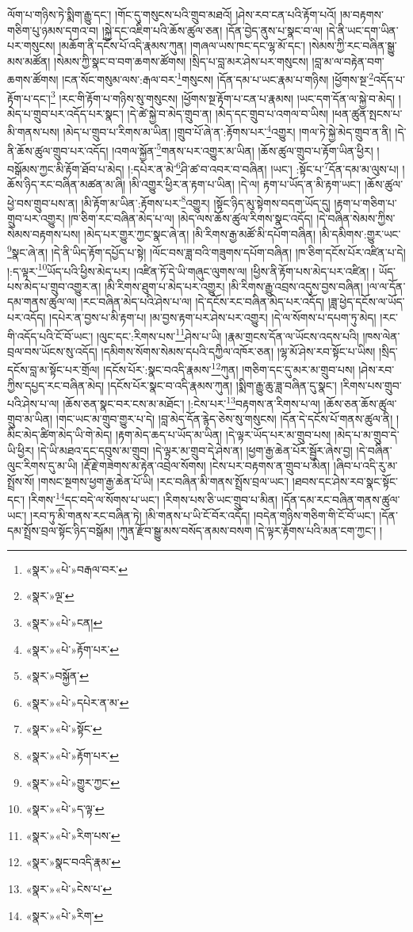 ལོག་པ་གཉིས་ཏེ་སྨིག་རྒྱུ་དང་། །གོང་དུ་གསུངས་པའི་གྲུབ་མཐའོ། །ཤེས་རབ་ངན་པའི་རྟོག་པའོ། །མ་བརྟགས་གཅིག་པུ་ཉམས་དགའ་བ། །སྐྱེ་དང་འཇིག་པའི་ཆོས་ཚུལ་ཅན། །དོན་བྱེད་ནུས་པ་སྣང་བ་ལ། །དེ་ནི་ཡང་དག་ཡིན་པར་གསུངས། །མཆོག་ནི་དངོས་པོ་འདི་རྣམས་ཀུན། །གཞལ་ཡས་ཁང་དང་ལྷ་མོ་དང་། །སེམས་ཀྱི་རང་བཞིན་སྒྱུ་མས་མཚོན། །སེམས་ཀྱི་སྣང་བ་བག་ཆགས་ཚོགས། །སྲིད་པ་བླ་མར་ཤེས་པར་གསུངས། །བླ་མ་ལ་བརྟེན་བག་ཆགས་ཚོགས། །ངན་སོང་གསུམ་ལས་:རྒལ་བར་\footnote{«སྣར་»«པེ་»བརྒལ་བར་}གསུངས། །དོན་དམ་པ་ཡང་རྣམ་པ་གཉིས། །ཕྱོགས་སྔ་\footnote{«སྣར་»ལྔ་}འདོད་པ་རྟོག་པ་དང་།\footnote{«སྣར་»«པེ་»ངན།} །རང་གི་རྟོག་པ་གཉིས་སུ་གསུངས། །ཕྱོགས་སྔ་རྟོག་པ་ངན་པ་རྣམས། །ཡང་དག་དོན་ལ་སྐྱེ་བ་མེད། །མེད་པ་གྲུབ་པར་འདོད་པར་སྣང་། །དེ་ཚེ་སྐྱེ་བ་མེད་གྲུབ་ན། །མེད་དང་གྲུབ་པ་འགལ་བ་ཡིས། །ཕན་ཚུན་སྤངས་པ་མི་གནས་པས། །མེད་པ་གྲུབ་པ་རིགས་མ་ཡིན། །གྲུབ་པོ་ཞེ་ན་:རྟོགས་པར་\footnote{«སྣར་»«པེ་»རྟོག་པར་}འགྱུར། །གལ་ཏེ་སྐྱེ་མེད་གྲུབ་ན་ནི། །དེ་ནི་ཆོས་ཚུལ་གྲུབ་པར་འདོད། །འགལ་སྐྱོན་\footnote{«སྣར་»བསྐྱོན་}གནས་པར་འགྱུར་མ་ཡིན། །ཆོས་ཚུལ་གྲུབ་པ་རྟོག་ཡིན་ཕྱིར། །བསྒོམས་ཀྱང་མི་རྟོག་ཐོབ་པ་མེད། །:དཔེར་ན་མེ་\footnote{«སྣར་»«པེ་»དཔེར་ན་མ་}ཤི་ཚ་བ་འབར་བ་བཞིན། །ཡང་། :སྟོང་པ་\footnote{«སྣར་»«པེ་»སྟོང་}དོན་དམ་མ་ལུས་པ། །ཆོས་ཉིད་རང་བཞིན་མཚན་མ་ཞི། །མི་འགྱུར་ཕྱིར་ན་རྟག་པ་ཡིན། །དེ་ལ། རྟག་པ་ཡོད་ན་མི་རྟག་ཡང་། །ཆོས་ཚུལ་ཕྱེ་བས་གྲུབ་པས་ན། །མི་རྟོག་མ་ཡིན་:རྟོགས་པར་\footnote{«སྣར་»«པེ་»རྟོག་པར་}འགྱུར། །སྟོང་ཉིད་མུ་སྟེགས་བདག་ཡོད་དུ། །རྟག་པ་གཅིག་པ་གྲུབ་པར་འགྱུར། །ཁ་ཅིག་རང་བཞིན་མེད་པ་ལ། །མེད་ལས་ཆོས་ཚུལ་རིགས་སྣང་འདོད། །དེ་བཞིན་སེམས་ཀྱིས་སེམས་བརྟགས་པས། །མེད་པར་གྱུར་ཀྱང་སྣང་ཞེ་ན། །མི་རིགས་རྒྱ་མཚོ་མི་དཔོག་བཞིན། །མི་དམིགས་:གྱུར་ཡང་\footnote{«སྣར་»«པེ་»གྱུར་ཀྱང་}སྣང་ཞེ་ན། །དེ་ནི་ཡིད་རྟོག་དཔྱོད་པ་སྟེ། །ལོང་བས་ཟླ་བའི་གཟུགས་དཔོག་བཞིན། །ཁ་ཅིག་དངོས་པོར་འཛིན་པ་དེ། །:ད་ལྟར་\footnote{«སྣར་»«པེ་»ད་ལྟ་}ཡོད་པའི་ཕྱིས་མེད་པར། །འཛིན་ཏོ་དེ་ཡི་གཞུང་ལུགས་ལ། །ཕྱིས་ནི་རྟོག་པས་མེད་པར་འཛིན། །
ཡོད་པས་མེད་པ་གྲུབ་འགྱུར་ན། །མི་རིགས་ཐུག་པ་མེད་པར་འགྱུར། །མི་རིགས་རྒྱུ་འབྲས་འདུས་བྱས་བཞིན། །ལ་ལ་དོན་དམ་གནས་ཚུལ་ལ། །རང་བཞིན་མེད་པའི་ཤེས་པ་ལ། །དེ་དངོས་རང་བཞིན་མེད་པར་འདོད། །ཟླ་ཕྱེད་དངོས་ལ་ཡོད་པར་འདོད། །དཔེར་ན་བྱས་པ་མི་རྟག་པ། །མ་བྱས་རྟག་པར་ཤེས་པར་འགྱུར། །དེ་ལ་སོགས་པ་དཔག་ཏུ་མེད། །རང་གི་འདོད་པའི་ངོ་བོ་ཡང་། །ལུང་དང་:རིགས་པས་\footnote{«སྣར་»«པེ་»རིག་པས་}ཤེས་པ་ཡི། །རྣམ་གྲངས་དོན་ལ་ཡོངས་འདས་པའི། །ཁས་ལེན་བྲལ་བས་ཡོངས་སུ་འདོད། །དམིགས་སོགས་སེམས་དཔའི་དཀྱིལ་འཁོར་ཅན། །ལྷ་མོ་ཤེས་རབ་སྟོང་པ་ཡིས། །སྲིད་དངོས་བླ་མ་སྟོང་པར་གྲོལ། །དངོས་པོར་:སྣང་བའདི་རྣམས་\footnote{«སྣར་»སྣང་བའདི་རྣམ་}ཀུན། །གཅིག་དང་དུ་མར་མ་གྲུབ་པས། །ཤེས་རབ་ཀྱིས་དཔྱད་རང་བཞིན་མེད། །དངོས་པོར་སྣང་བ་འདི་རྣམས་ཀུན། །སྨིག་རྒྱུ་ཆུ་ཟླ་བཞིན་དུ་སྣང་། །རིགས་པས་གྲུབ་པའི་ཤེས་པ་ལ། །ཆོས་ཅན་སྣང་བར་ངས་མ་མཐོང་། །:ངེས་པར་\footnote{«སྣར་»«པེ་»ངེས་པ་}བརྟགས་ན་རིགས་པ་ལ། །ཆོས་ཅན་ཆོས་ཚུལ་གྲུབ་མ་ཡིན། །གང་ཡང་མ་གྲུབ་གྱུར་པ་དེ། །བླ་མེད་དོན་རྙེད་ཅེས་སུ་གསུངས། །དོན་དེ་དངོས་པོ་གནས་ཚུལ་ནི། །མིང་མེད་ཚིག་མེད་ཡི་གེ་མེད། །རྟག་མེད་ཆད་པ་ཡོད་མ་ཡིན། །དེ་ལྟར་ཡོད་པར་མ་གྲུབ་པས། །མེད་པ་མ་གྲུབ་དེ་ཡི་ཕྱིར། །དེ་ཡི་མཐའ་དང་དབུས་མ་གྲུབ། །དེ་ལྟར་མ་གྲུབ་དེ་ཤེས་ན། །ཕྱག་རྒྱ་ཆེན་པོར་སྦྱོར་ཞེས་བྱ། །དེ་བཞིན་ལུང་རིགས་དུ་མ་ཡི། །རྡོ་རྗེ་གཟེགས་མ་རྟེན་འབྲེལ་སོགས། །ངེས་པར་བརྟགས་ན་གྲུབ་པ་མིན། །ཞིབ་པ་འདི་རུ་མ་སྤྲོས་སོ། །གསང་སྔགས་ཕྱག་རྒྱ་ཆེན་པོ་ཡི། །རང་བཞིན་མི་གནས་སྤྲོས་བྲལ་ཡང་། །ཐབས་དང་ཤེས་རབ་སྣང་སྟོང་དང་། །རིགས་\footnote{«སྣར་»«པེ་»རིག་}དང་བདེ་ལ་སོགས་པ་ཡང་། །རིགས་པས་ཅི་ཡང་གྲུབ་པ་མིན། །དོན་དམ་རང་བཞིན་གནས་ཚུལ་ཡང་། །རབ་ཏུ་མི་གནས་རང་བཞིན་ཏེ། །མི་གནས་པ་ཡི་ངོ་བོར་འདོད། །བདེན་གཉིས་གཅིག་གི་ངོ་བོ་ཡང་། །དོན་དམ་སྤྲོས་བྲལ་སྟོང་ཉིད་བསྒོམ། །ཀུན་རྫོབ་སྒྱུ་མས་བསོད་ནམས་བསག །དེ་ལྟར་རྟོགས་པའི་མན་ངག་ཀྱང་། །
